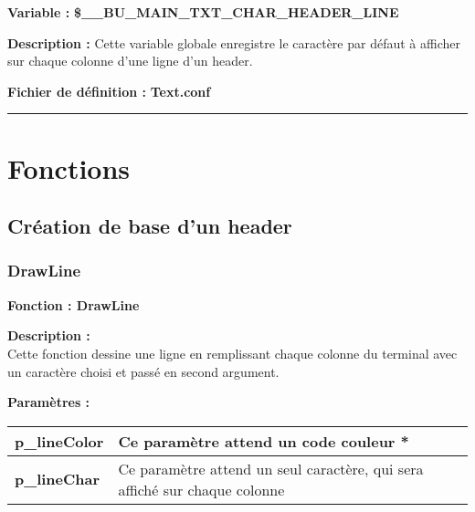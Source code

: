 \documentclass[a4paper,10pt]{article}
\begin{document}
\textbf{Variable :} \textbf{\color{orange}\$\_\_BU\_MAIN\_TXT\_CHAR\_HEADER\_LINE\color{white}}\\[1\baselineskip]

\begin{justify}
    \textbf{Description :} Cette variable globale enregistre le caractère par défaut à afficher sur chaque colonne d'une ligne d'un header.
\end{justify}

\textbf{Fichier de définition :} \textbf{\color{lime}Text.conf\color{white}}\\[1\baselineskip]





\color{red}\par\noindent\rule{\textwidth}{0.4pt}\color{white}

\color{red}
\section{Fonctions}\color{white}

\color{green}
\subsection{Création de base d'un header}\color{white}

\color{blue}
\subsubsection{DrawLine}\color{white}

\textbf{Fonction : \color{mauve}DrawLine\color{white}}\\[1\baselineskip]

\begin{justify}
    \textbf{Description :}\\
    Cette fonction dessine une ligne en remplissant chaque colonne du terminal avec un caractère choisi et passé en second argument.
\end{justify}

\textbf{Paramètres :}\\[1\baselineskip]
\begin{tabular}{|l|l|}
\hline
\textbf{\color{orange}p\_lineColor\color{white}} & Ce paramètre attend un code couleur * \\
\hline
\textbf{\color{orange}p\_lineChar\color{white}} & Ce paramètre attend un seul caractère, qui sera affiché sur chaque colonne \\
\hline
\end{tabular}
\end{document}
